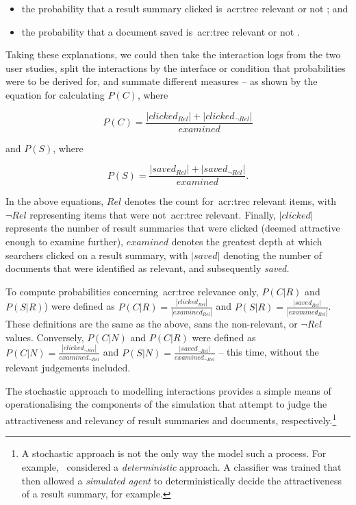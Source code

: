\begin{itemize}
    \item{the probability that a result summary clicked is~\gls{acr:trec} relevant  or not ; and}
    \item{the probability that a document saved is~\gls{acr:trec} relevant  or not .}
\end{itemize}

Taking these explanations, we could then take the interaction logs from the two user studies, split the interactions by the interface or condition that probabilities were to be derived for, and summate different measures -- as shown by the equation for calculating $P(C)$, where

\begin{equation}
    P(C) = \frac{|clicked_{Rel}| + |clicked_{\neg Rel}|}{examined}
\end{equation}

and $P(S)$, where

\begin{equation}
    P(S) = \frac{|saved_{Rel}| + | saved_{\neg Rel} |}{examined}.
\end{equation}

In the above equations, $Rel$ denotes the count for~\gls{acr:trec} relevant items, with $\neg Rel$ representing items that were not~\gls{acr:trec} relevant. Finally, $|clicked|$ represents the number of result summaries that were clicked (deemed attractive enough to examine further), $examined$ denotes the greatest depth at which searchers clicked on a result summary, with $|saved|$ denoting the number of documents that were identified as relevant, and subsequently \emph{saved.}

To compute probabilities concerning~\gls{acr:trec} relevance only, $P(C|R)$ and $P(S|R)$) were defined as $P(C|R) = \frac{|clicked_{Rel}|}{|examined_{Rel}|}$ and $P(S|R) = \frac{|saved_{Rel}|}{|examined_{Rel}|}$. These definitions are the same as the above, sans the non-relevant, or $\neg Rel$ values. Conversely, $P(C|N)$ and $P(C|R)$ were defined as $P(C|N) = \frac{|clicked_{\neg Rel}|}{examined_{\neg Rel}}$ and $P(S|N) = \frac{|saved_{\neg Rel}|}{examined_{\neg Rel}}$ -- this time, without the relevant judgements included.

The stochastic approach to modelling interactions provides a simple means of operationalising the components of the simulation that attempt to judge the attractiveness and relevancy of result summaries and documents, respectively.\footnote{A stochastic approach is not the only way the model such a process. For example,~\cite{maxwell2016agents} considered a \emph{deterministic} approach. A classifier was trained that then allowed a \emph{simulated agent} to deterministically decide the attractiveness of a result summary, for example.}

